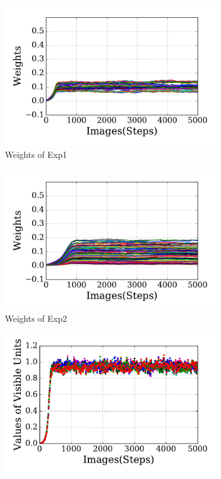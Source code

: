 \begin{figure}
	\centering
	\begin{subfigure}[t]{0.45\textwidth}
		\includegraphics[width=\textwidth]{pics_sdlm/31_exp_RBM_noise/exp1_weights_s.pdf}
		\caption{Weights of Exp1}
	\end{subfigure}
	\begin{subfigure}[t]{0.45\textwidth}
		\includegraphics[width=\textwidth]{pics_sdlm/31_exp_RBM_noise/exp2_weights_s.pdf}
		\caption{Weights of Exp2}
	\end{subfigure}
	\begin{subfigure}[t]{0.45\textwidth}
		\includegraphics[width=\textwidth]{pics_sdlm/31_exp_RBM_noise/exp1_recon_s.pdf}

\end{subfigure}
\end{figure}
